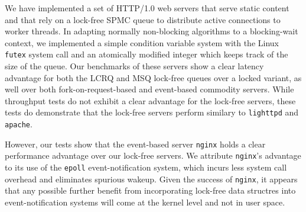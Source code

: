 \documentclass[twoside,10pt]{article}
\begin{document}
\begin{multicols}{2}
We have implemented a set of HTTP/1.0 web servers that serve static
content and that rely on a lock-free SPMC queue to distribute active
connections to worker threads. In adapting normally non-blocking
algorithms to a blocking-wait context, we implemented a simple
condition variable system with the Linux \verb+futex+ system call and
an atomically modified integer which keeps track of the size of the
queue. Our benchmarks of these servers show a clear latency advantage
for both the LCRQ and MSQ lock-free queues over a locked variant, as
well over both fork-on-request-based and event-based commodity
servers. While throughput tests do not exhibit a clear advantage for
the lock-free servers, these tests do demonstrate that the lock-free
servers perform similary to \verb+lighttpd+ and \verb+apache+.

However, our tests show that the event-based server \verb+nginx+ holds
a clear performance advantage over our lock-free servers. We attribute
\verb+nginx+'s advantage to its use of the \verb+epoll+
event-notification system, which incurs less system call overhead and
eliminates spurious wakeup. Given the success of \verb+nginx+, it
appears that any possible further benefit from incorporating lock-free
data structres into event-notification systems will come at the kernel
level and not in user space.



\end{multicols}

{\small
  
  
}
\end{document}
